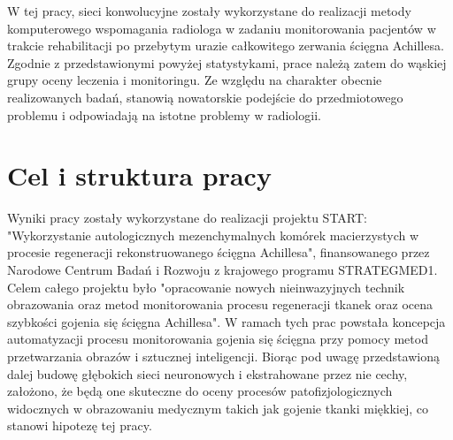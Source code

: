 W tej pracy, sieci konwolucyjne zostały wykorzystane do realizacji metody komputerowego wspomagania radiologa w zadaniu monitorowania pacjentów w trakcie rehabilitacji po przebytym urazie całkowitego zerwania ścięgna Achillesa. Zgodnie \linebreak z przedstawionymi powyżej statystykami, prace należą zatem do wąskiej grupy oceny leczenia i monitoringu. Ze względu na charakter obecnie realizowanych badań, stanowią nowatorskie podejście do przedmiotowego problemu i odpowiadają na istotne problemy w radiologii.


\chapter{Cel i struktura pracy}

Wyniki pracy zostały wykorzystane do realizacji projektu START: "Wykorzystanie autologicznych mezenchymalnych komórek macierzystych w procesie regeneracji rekonstruowanego ścięgna Achillesa", finansowanego przez Narodowe Centrum Badań i Rozwoju z krajowego programu STRATEGMED1. Celem całego projektu było "opracowanie nowych nieinwazyjnych technik obrazowania oraz metod monitorowania procesu regeneracji tkanek oraz ocena szybkości gojenia się ścięgna Achillesa". \linebreak W ramach tych prac powstała koncepcja automatyzacji procesu monitorowania gojenia się ścięgna przy pomocy metod przetwarzania obrazów i sztucznej inteligencji. Biorąc pod uwagę przedstawioną dalej budowę głębokich sieci neuronowych i ekstrahowane przez nie cechy, założono, że będą one skuteczne do oceny procesów patofizjologicznych widocznych w obrazowaniu medycznym takich jak gojenie tkanki miękkiej, co stanowi hipotezę tej pracy.

